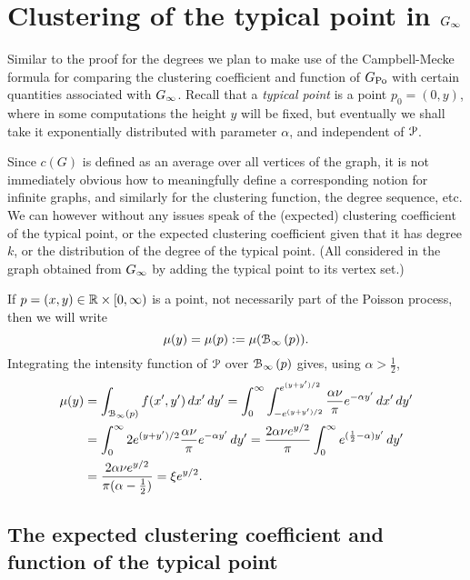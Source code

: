 


\section{Clustering of the typical point in $G_{\infty}$\label{sec:Ginf}\label{sec:asymptotics_average_clustering_ast_P}}


Similar to the proof for the degrees we plan to make use of the Campbell-Mecke formula for comparing the clustering coefficient and function of $G_{{\mathrm{Po}}}$ with certain quantities associated with $G_{\infty}$. Recall that a \emph{typical point} is a point $p_0 = (0,y)$, where in some computations the height $y$ will be fixed, but eventually we shall take it exponentially distributed with parameter $\alpha$, and independent of ${\mathcal P}$.

Since $c(G)$ is defined as an average over all vertices of the graph, it is not immediately obvious how to meaningfully define a corresponding notion for infinite graphs, and similarly for the clustering function, the degree sequence, etc.
We can however without any issues speak of the (expected) clustering coefficient of the typical point, or the expected clustering coefficient given that it has degree $k$, or the distribution of the degree of the typical point. (All considered in the graph obtained from $G_{\infty}$ by adding the typical point to its vertex set.)

If $p = (x,y) \in {\mathbb R}\times[0,\infty)$ is a point, not necessarily part of the Poisson process, then we will write
\[ 
	\mu(y) = \mu(p) := \mu({\mathcal B}_{\infty}\left(p\right)).
\]
Integrating the intensity function of ${\mathcal P}$ over ${\mathcal B}_{\infty}\left(p\right)$ gives, using $\alpha>\frac{1}{2}$,
\begin{align*}
	\mu(y) &= \int_{{\mathcal B}_{\infty}\left(p\right)} f(x',y') \, dx' \,d y'  
 		= \int_0^\infty \int_{-e^{(y+y')/2}}^{e^{(y+y')/2}} \frac{\alpha \nu}{\pi} e^{-\alpha y'} \, dx' \, dy' \\
	&= \int_0^\infty 2 e^{(y+y')/2} \frac{\alpha \nu}{\pi} e^{-\alpha y'} \, dy' 
 		= \frac{2\alpha \nu e^{y/2}}{\pi} \int_0^\infty e^{(\frac12-\alpha)y'} \, dy' \\
	&= \frac{2\alpha \nu e^{y/2}}{\pi(\alpha-\frac12)} = \xi e^{y/2}.
\end{align*}





\subsection{The expected clustering coefficient and function of the typical point}


